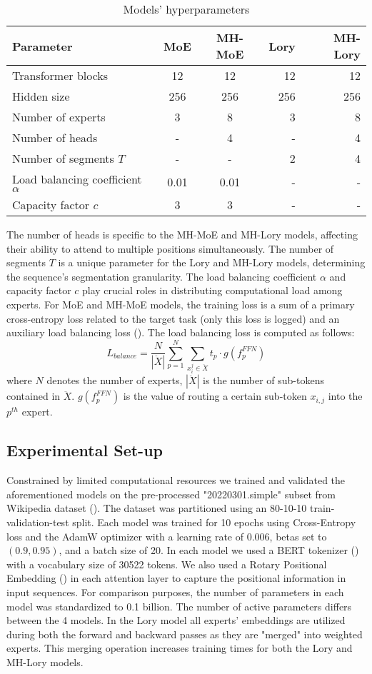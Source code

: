 \documentclass[12pt]{article}
\begin{document}
\begin{table}[h!]
\centering
\begin{tabular}{|l|c|c|r|r|}
\hline
Parameter & \textbf{MoE} & \textbf{MH-MoE} & \textbf{Lory} & \textbf{MH-Lory} \\
\hline
Transformer blocks & 12 & 12 & 12 & 12 \\
Hidden size  & 256 & 256 & 256 & 256 \\
Number of experts& 3 & 8 & 3 & 8 \\

\hline
Number of heads & - & 4 & - & 4 \\
Number of segments $T$ & - & - & 2 & 4 \\
Load balancing coefficient $\alpha$ & 0.01 & 0.01 & - & - \\
Capacity factor $c$ & 3 & 3 & - & - \\
\hline
\end{tabular}
\caption{Models' hyperparameters}
\label{tab:hyperparams_table}
\end{table}
The number of heads is specific to the MH-MoE and MH-Lory models, affecting their ability to attend to multiple positions simultaneously. The number of segments $T$ is a unique parameter for the Lory and MH-Lory models, determining the sequence's segmentation granularity. 
The load balancing coefficient $\alpha$ and capacity factor $c$ play crucial roles in distributing computational load among experts. 
For MoE and MH-MoE models, the training loss is a sum of a primary cross-entropy loss related to the target task (only this loss is logged) and an auxiliary load balancing loss (\cite{wu2024multihead}). The load balancing loss is computed as follows:
\[ L_{balance} = \frac{N}{|\ddot{X}|} \sum_{p=1}^{N} \sum_{x_i^j \in \ddot{X}} t_p \cdot g(f_p^{FFN}) \]
where $N$ denotes the number of experts, $|\ddot{X}|$ is the number of sub-tokens contained in $\ddot{X}$. $g(f_p^{FFN})$ is the value of routing a certain sub-token $x_{i,j}$ into the $p^{th}$ expert.


\subsection{Experimental Set-up}
Constrained by limited computational resources we trained and validated the aforementioned models on the pre-processed "20220301.simple" subset from Wikipedia dataset (\cite{wikidump}).
The dataset was partitioned using an 80-10-10 train-validation-test split. Each model was trained for 10 epochs using Cross-Entropy loss and the AdamW optimizer with a learning rate of $0.006$, betas set to $(0.9, 0.95)$, and a batch size of 20. In each model we used a BERT tokenizer (\cite{devlin2018bert}) with a vocabulary size of 30522 tokens. We also used a Rotary Positional Embedding (\cite{su2024roformer}) in each attention layer to capture the positional information in input sequences. For comparison purposes, the number of parameters in each model was standardized to 0.1 billion. The number of active parameters differs between the 4 models. In the Lory model all experts' embeddings are utilized during both the forward and backward passes as they are "merged" into weighted experts. This merging operation increases training times for both the Lory and MH-Lory models.
\end{document}
